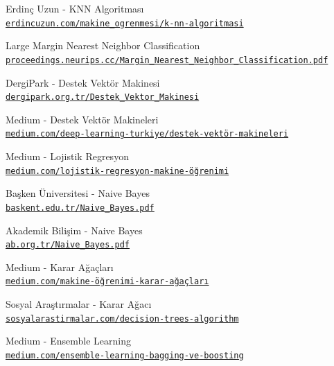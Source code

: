 \documentclass[conference]{IEEEtran}
\begin{document}
\begin{thebibliography}{6}
Erdinç Uzun - KNN Algoritması
\\\texttt{\href{https://erdincuzun.com/makine_ogrenmesi/k-nn-algoritmasi/}{\nolinkurl{erdincuzun.com/makine_ogrenmesi/k-nn-algoritmasi}}}

Large Margin Nearest Neighbor Classification
\\\texttt{\href{https://proceedings.neurips.cc/paper/2005/file/a7f592cef8b130a6967a90617db5681b-Paper.pdf}{\nolinkurl{proceedings.neurips.cc/Margin_Nearest_Neighbor_Classification.pdf}}}

DergiPark - Destek Vektör Makinesi
\\\texttt{\href{https://dergipark.org.tr/tr/download/article-file/65371}{\nolinkurl{dergipark.org.tr/Destek_Vektor_Makinesi}}}

Medium - Destek Vektör Makineleri
\\\texttt{\href{https://medium.com/deep-learning-turkiye/nedir-bu-destek-vektör-makineleri-makine-öğrenmesi-serisi-2-94e576e4223e}{\nolinkurl{medium.com/deep-learning-turkiye/destek-vektör-makineleri}}}

Medium - Lojistik Regresyon
\\\texttt{\href{https://medium.com/@k.ulgen90/lojistik-regresyon-makine-öğrenimi-bölüm-7-c6bc685a4084}{\nolinkurl{medium.com/lojistik-regresyon-makine-öğrenimi}}}

Başken Üniversitesi - Naive Bayes
\\\texttt{\href{https://mail.baskent.edu.tr/~20410964/DM_9.pdf}{\nolinkurl{baskent.edu.tr/Naive_Bayes.pdf}}}

Akademik Bilişim - Naive Bayes
\\\texttt{\href{https://ab.org.tr/ab14/bildiri/186.pdf}{\nolinkurl{ab.org.tr/Naive_Bayes.pdf}}}

Medium - Karar Ağaçları
\\\texttt{\href{https://medium.com/@k.ulgen90/makine-öğrenimi-bölüm-5-karar-ağaçları-c90bd7593010}{\nolinkurl{medium.com/makine-öğrenimi-karar-ağaçları}}}

Sosyal Araştırmalar - Karar Ağacı
\\\texttt{\href{https://www.sosyalarastirmalar.com/articles/text-classification-via-decision-trees-algorithm-customer-comments-case.pdf}{\nolinkurl{sosyalarastirmalar.com/decision-trees-algorithm}}}

Medium - Ensemble Learning
\\\texttt{\href{https://medium.com/deep-learning-turkiye/ensemble-learning-bagging-ve-boosting-50643428b22b}{\nolinkurl{medium.com/ensemble-learning-bagging-ve-boosting}}}


\end{thebibliography}
\end{document}
